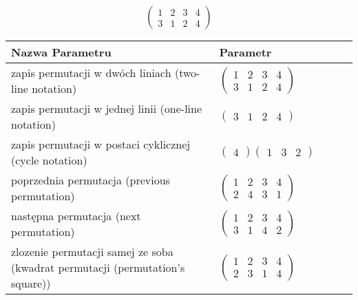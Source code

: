 \documentclass[12pt]{article}
\begin{document}
\subsection{}
\begin{center}
\[
\begin{pmatrix}
	1 & 2 & 3 & 4 \\ 
	3 & 1 & 2 & 4 
\end{pmatrix}
\]

\begin{tabular}{|m{0.6\linewidth}|m{0.4\linewidth}|}
	\hline
	Nazwa Parametru & Parametr \\
	\hline
	zapis permutacji w dwóch liniach (two-line notation) & $\begin{pmatrix} 1 & 2 & 3 & 4 \\ 
3 & 1 & 2 & 4 \end{pmatrix}$ \\ 
	\hline
	zapis permutacji w jednej linii (one-line notation) & $\begin{pmatrix} 3 & 1 & 2 & 4 \end{pmatrix}$ \\ 
	\hline
	zapis permutacji w postaci cyklicznej (cycle notation) & $\begin{pmatrix} 4 \end{pmatrix} \begin{pmatrix} 1 & 3 & 2 \end{pmatrix} $ \\ 
	\hline
	poprzednia permutacja (previous permutation) & $\begin{pmatrix} 1 & 2 & 3 & 4 \\ 
2 & 4 & 3 & 1 \end{pmatrix}$ \\ 
	\hline
	następna permutacja (next permutation) & $\begin{pmatrix} 1 & 2 & 3 & 4 \\ 
3 & 1 & 4 & 2 \end{pmatrix}$ \\ 
	\hline
	zlozenie permutacji samej ze soba (kwadrat permutacji (permutation's square)) & $\begin{pmatrix} 1 & 2 & 3 & 4 \\ 
2 & 3 & 1 & 4 \end{pmatrix}$ \\ 
	\hline
\end{tabular}
\end{center}
\end{document}
